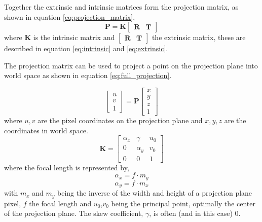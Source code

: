 \noindent
Together the extrinsic and intrinsic matrices form the projection matrix,
as shown in equation \ref{eq:projection_matrix},
\begin{equation} \label{eq:projection_matrix}
    \boldsymbol{P} = \boldsymbol{K}
    \begin{bmatrix}
        \boldsymbol{R} & \boldsymbol{T}
    \end{bmatrix}
\end{equation}
where \(\boldsymbol{K}\) is the intrinsic matrix and \(\begin{bmatrix} \boldsymbol{R} & \boldsymbol{T} \end{bmatrix}\) the extrinsic matrix, these are described
in equation \ref{eq:intrinsic} and \ref{eq:extrinsic}.

The projection matrix can be used to project a point on the projection plane into world space as shown in equation \ref{eq:full_projection}.

\begin{equation} \label{eq:full_projection}
    \begin{bmatrix}
        u \\
        v \\
        1
    \end{bmatrix}
    = \boldsymbol{P}
    \begin{bmatrix}
        x \\
        y \\
        z \\
        1
    \end{bmatrix}
\end{equation}
where \(u,v\) are the pixel coordinates on the projection plane and \(x,y,z\) are the coordinates in world space.
\begin{equation} \label{eq:intrinsic}
    \boldsymbol{K} =
    \begin{bmatrix}
        \alpha_x & \gamma   & u_0 \\
        0        & \alpha_y & v_0 \\
        0        & 0        & 1
    \end{bmatrix}
\end{equation}
where the focal length is represented by,
\[\alpha_x = f \cdot m_y\]
\[\alpha_y = f \cdot m_x\]
with \(m_x\) and \(m_y\) being the inverse of the width and height of a projection plane pixel, \(f\) the focal length and \(u_0\),\(v_0\) being the principal point, optimally the center of the projection plane.
The skew coefficient, \(\gamma\), is often (and in this case) 0.

